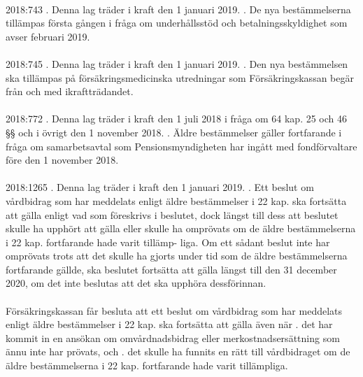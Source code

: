 \documentclass[a4paper,notitlepage,openany,10pt]{book}
\begin{document}
\paragraph*{}
2018:743
. Denna lag träder i kraft den 1 januari 2019.
. De nya bestämmelserna tillämpas första gången i fråga om underhållsstöd och betalningsskyldighet som avser februari 2019.
\paragraph*{}
2018:745
. Denna lag träder i kraft den 1 januari 2019.
. Den nya bestämmelsen ska tillämpas på försäkringsmedicinska utredningar som Försäkringskassan begär från och med ikraftträdandet.
\paragraph*{}
2018:772
. Denna lag träder i kraft den 1 juli 2018 i fråga om 64 kap. 25 och 46 §§ och i övrigt den 1 november 2018.
. Äldre bestämmelser gäller fortfarande i fråga om samarbetsavtal som Pensionsmyndigheten har ingått med fondförvaltare före den 1 november 2018.
\paragraph*{}
2018:1265
. Denna lag träder i kraft den 1 januari 2019.
. Ett beslut om vårdbidrag som har meddelats enligt äldre bestämmelser i 22 kap. ska fortsätta att gälla enligt vad som föreskrivs i beslutet, dock längst till dess att beslutet skulle ha upphört att gälla eller skulle ha omprövats om de äldre bestämmelserna i 22 kap. fortfarande hade varit tillämp- liga. Om ett sådant beslut inte har omprövats trots att det skulle ha gjorts under tid som de äldre bestämmelserna fortfarande gällde, ska beslutet fortsätta att gälla längst till den 31 december 2020, om det inte beslutas att det ska upphöra dessförinnan.
\paragraph*{}
Försäkringskassan får besluta att ett beslut om vårdbidrag som har meddelats enligt äldre bestämmelser i 22 kap. ska fortsätta att gälla även när
. det har kommit in en ansökan om omvårdnadsbidrag eller merkostnadsersättning som ännu inte har prövats, och
. det skulle ha funnits en rätt till vårdbidraget om de äldre bestämmelserna i 22 kap. fortfarande hade varit tillämpliga.
\end{document}
